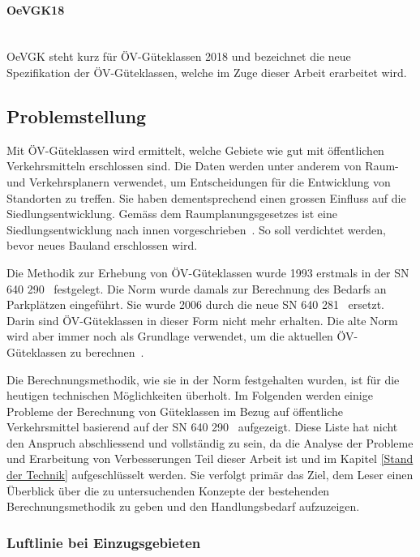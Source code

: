 \paragraph{OeVGK18}~\\
OeVGK steht kurz für \acs{ÖV}-Güteklassen 2018 und bezeichnet die neue Spezifikation der \acs{ÖV}-Güteklassen, welche im Zuge dieser Arbeit erarbeitet wird.

\subsection{Problemstellung}
\label{Einführung:Problemstellung}

Mit \acs{ÖV}-Güteklassen wird ermittelt, welche Gebiete wie gut mit öffentlichen Verkehrsmitteln erschlossen sind.
Die Daten werden unter anderem von Raum- und Verkehrsplanern verwendet, um Entscheidungen für die Entwicklung von Standorten zu treffen.
Sie haben dementsprechend einen grossen Einfluss auf die Siedlungsentwicklung.
Gemäss dem Raumplanungsgesetzes ist eine Siedlungsentwicklung nach innen vorgeschrieben~\cite{raumplanungsgesetz}.
So soll verdichtet werden, bevor neues Bauland erschlossen wird.

Die Methodik zur Erhebung von \acs{ÖV}-Güteklassen wurde 1993 erstmals in der \ac{SN} 640 290~\cite{sn640290} festgelegt.
Die Norm wurde damals zur Berechnung des Bedarfs an Parkplätzen eingeführt.
Sie wurde 2006 durch die neue \acs{SN} 640 281~\cite{sn640281} ersetzt.
Darin sind \acs{ÖV}-Güteklassen in dieser Form nicht mehr erhalten. Die alte Norm wird aber immer noch als Grundlage verwendet, um die aktuellen \acs{ÖV}-Güteklassen zu berechnen~\cite{berechnung_are}.

Die Berechnungsmethodik, wie sie in der Norm festgehalten wurden, ist für die heutigen technischen Möglichkeiten überholt.
Im Folgenden werden einige Probleme der Berechnung von Güteklassen im Bezug auf öffentliche Verkehrsmittel basierend auf der \ac{SN} 640 290~\cite{sn640290} aufgezeigt.
Diese Liste hat nicht den Anspruch abschliessend und vollständig zu sein, da die Analyse der Probleme und Erarbeitung von Verbesserungen Teil dieser Arbeit ist und im Kapitel \ref{Stand der Technik} aufgeschlüsselt werden.
Sie verfolgt primär das Ziel, dem Leser einen Überblick über die zu untersuchenden Konzepte der bestehenden Berechnungsmethodik zu geben und den Handlungsbedarf aufzuzeigen.

\subsubsection{Luftlinie bei Einzugsgebieten}
\label{Problemstellung:Luftlinie bei Einzugsgebieten}

